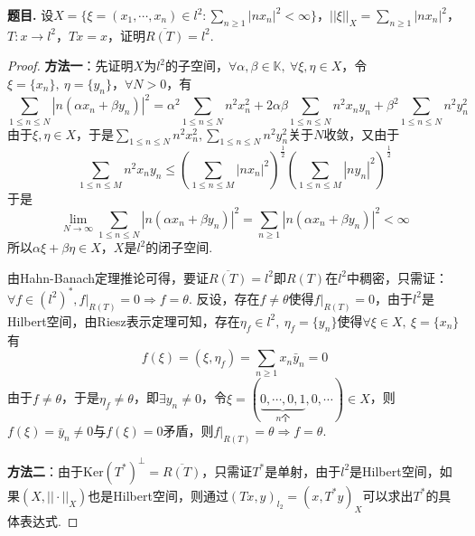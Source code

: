 \documentclass[12pt, a4paper, oneside]{ctexart}
\newcounter{problem}  %
\newenvironment{problem}[1][]{\stepcounter{problem}\par\noindent\textbf{题目\arabic{problem}. #1}}{\smallskip\par}
\let\leq=\leqslant %
\let\geq=\geqslant %
\def\K{\mathbb{K}}          %
\def\ker{\mathrm{Ker}}      %
\def\ol{\overline}          %
\begin{document}
\begin{problem}
    设$X = \{\xi = (x_1,\cdots, x_n)\in l^2:\sum_{n\geq 1}|nx_n|^2 < \infty\}$，$||\xi||_X = \sum_{n\geq 1}|nx_n|^2$，$T:x\to l^2$，$Tx=x$，证明$\ol{R(T)} = l^2$.
\end{problem}
\begin{proof}
    \textbf{方法一}：先证明$X$为$l^2$的子空间，$\forall \alpha,\beta\in \K,\ \forall \xi,\eta\in X$，令$\xi = \{x_n\},\ \eta = \{y_n\}$，$\forall N > 0$，有
    \begin{equation*}
        \sum_{1\leq n\leq N}|n(\alpha x_n+\beta y_n)|^2 = \alpha^2\sum_{1\leq n\leq N}n^2x_n^2+2\alpha\beta\sum_{1\leq n\leq N}n^2x_ny_n + \beta^2\sum_{1\leq n\leq N}n^2y_n^2
    \end{equation*}
    由于$\xi,\eta\in X$，于是$\sum_{1\leq n\leq N}n^2x_n^2,\sum_{1\leq n\leq N}n^2y_n^2$关于$N$收敛，又由于
    \begin{equation*}
        \sum_{1\leq n\leq M}n^2x_ny_n\leq \left(\sum_{1\leq n\leq M}|nx_n|^2\right)^{\frac{1}{2}}\left(\sum_{1\leq n\leq M}|ny_n|^2\right)^{\frac{1}{2}}
    \end{equation*}
    于是
    \begin{equation*}
        \lim_{N\to\infty}\sum_{1\leq n\leq N}|n(\alpha x_n+\beta y_n)|^2 = \sum_{n\geq 1}|n(\alpha x_n+\beta y_n)|^2 < \infty
    \end{equation*}
    所以$\alpha \xi+\beta\eta\in X$，$X$是$l^2$的闭子空间.

    由Hahn-Banach定理推论可得，要证$\ol{R(T)} = l^2$即$R(T)$在$l^2$中稠密，只需证：$\forall f\in (l^2)^*,f|_{R(T)} = 0\Rightarrow f=\theta$. 反设，存在$f\neq \theta$使得$f|_{R(T)}=0$，由于$l^2$是Hilbert空间，由Riesz表示定理可知，存在$\eta_f\in l^2,\ \eta_f = \{y_n\}$使得$\forall \xi\in X,\ \xi = \{x_n\}$有
    \begin{equation*}
        f(\xi) = (\xi,\eta_f) = \sum_{n\geq 1}x_n\bar{y}_n = 0
    \end{equation*}
    由于$f\neq \theta$，于是$\eta_f\neq \theta$，即$\exists y_n\neq 0$，令$\xi = (\underbrace{0,\cdots,0,1}_{n\text{个}},0,\cdots)\in X$，则$f(\xi) = \bar{y}_n\neq 0$与$f(\xi) = 0$矛盾，则$f|_{R(T)}=\theta\Rightarrow f= \theta$.

    \textbf{方法二}：由于$\ker(T^*)^\perp = \ol{R(T)}$，只需证$T^*$是单射，由于$l^2$是Hilbert空间，如果$(X,||\cdot||_X)$也是Hilbert空间，则通过$(Tx,y)_{l_2} = (x,T^*y)_X$可以求出$T^*$的具体表达式.


\end{proof}
\end{document}
